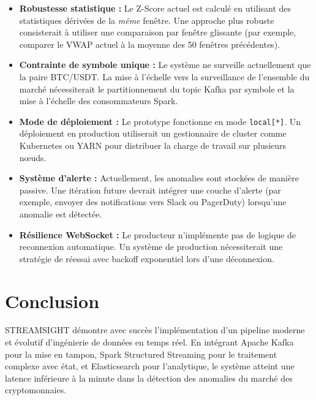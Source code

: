 \documentclass[12pt, a4paper]{article}
\begin{document}
\begin{itemize}
    \item \textbf{Robustesse statistique :} Le Z-Score actuel est calcul\'e en utilisant des statistiques d\'eriv\'ees de la \textit{m\^eme} fen\^etre. Une approche plus robuste consisterait \`a utiliser une comparaison par fen\^etre glissante (par exemple, comparer le VWAP actuel \`a la moyenne des 50 fen\^etres pr\'ec\'edentes).
    \item \textbf{Contrainte de symbole unique :} Le syst\`eme ne surveille actuellement que la paire BTC/USDT. La mise \`a l'\'echelle vers la surveillance de l'ensemble du march\'e n\'ecessiterait le partitionnement du topic Kafka par symbole et la mise \`a l'\'echelle des consommateurs Spark.
    \item \textbf{Mode de d\'eploiement :} Le prototype fonctionne en mode \texttt{local[*]}. Un d\'eploiement en production utiliserait un gestionnaire de cluster comme Kubernetes ou YARN pour distribuer la charge de travail sur plusieurs n\oe uds.
    \item \textbf{Syst\`eme d'alerte :} Actuellement, les anomalies sont stock\'ees de mani\`ere passive. Une it\'eration future devrait int\'egrer une couche d'alerte (par exemple, envoyer des notifications vers Slack ou PagerDuty) lorsqu'une anomalie est d\'etect\'ee.
    \item \textbf{R\'esilience WebSocket :} Le producteur n'impl\'emente pas de logique de reconnexion automatique. Un syst\`eme de production n\'ecessiterait une strat\'egie de r\'eessai avec backoff exponentiel lors d'une d\'econnexion.
\end{itemize}

\section{Conclusion}

STREAMSIGHT d\'emontre avec succ\`es l'impl\'ementation d'un pipeline moderne et \'evolutif d'ing\'enierie de donn\'ees en temps r\'eel. En int\'egrant Apache Kafka pour la mise en tampon, Spark Structured Streaming pour le traitement complexe avec \'etat, et Elasticsearch pour l'analytique, le syst\`eme atteint une latence inf\'erieure \`a la minute dans la d\'etection des anomalies du march\'e des cryptomonnaies.
\end{document}
